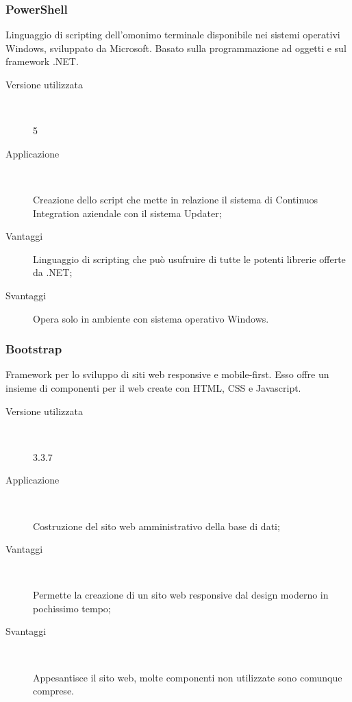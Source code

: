 \documentclass[../RelazioneFinale.tex]{subfiles}
\begin{document}
			\subsubsection{PowerShell}
				Linguaggio di scripting dell'omonimo terminale disponibile nei sistemi operativi Windows, sviluppato da Microsoft. Basato sulla programmazione ad oggetti e sul framework .NET.
				\begin{description}
					\item[Versione utilizzata] \ \par
					5
					\item[Applicazione] \ \par
					Creazione dello script che mette in relazione il sistema di Continuos Integration aziendale con il sistema Updater;
					\item[Vantaggi]
					Linguaggio di scripting che può usufruire di tutte le potenti librerie offerte da .NET;
					\item[Svantaggi]
					Opera solo in ambiente con sistema operativo Windows.
				\end{description}
				
			\subsubsection{Bootstrap}
				Framework per lo sviluppo di siti web responsive e mobile-first. Esso offre un insieme di componenti per il web create con HTML, CSS e Javascript.	
			\begin{description}
				\item[Versione utilizzata] \ \par
				3.3.7
				\item[Applicazione] \ \par
				Costruzione del sito web amministrativo della base di dati;
				\item[Vantaggi] \ \par
				Permette la creazione di un sito web responsive dal design moderno in pochissimo tempo;
				\item[Svantaggi] \ \par
				Appesantisce il sito web, molte componenti non utilizzate sono comunque comprese.
			\end{description}
			
			
\end{document}
